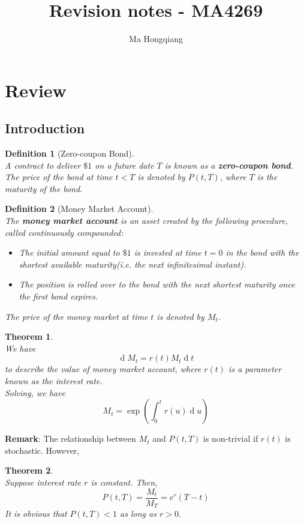 \documentclass[12pt]{article}
\newtheorem{definition}{Definition}[section]
\newtheorem{theorem}{Theorem}[section]
\theoremstyle{definition}
\DeclareMathOperator{\diff}{d}
\begin{document}
\title{Revision notes - MA4269}
\author{Ma Hongqiang}
\maketitle
\tableofcontents

\clearpage
\section{Review}
\subsection{Introduction}
\begin{definition}[Zero-coupon Bond]
\hfill\\\normalfont A contract to deliver $\$1$ on a future date $T$ is known as a \textbf{zero-coupon bond}.\\
The price of the bond at time $t<T$ is denoted by $P(t,T)$, where $T$ is the maturity of the bond.
\end{definition}
\begin{definition}[Money Market Account]
\hfill\\\normalfont The \textbf{money market account} is an asset created by the following procedure, called continuously compounded:
\begin{itemize}
  \item The initial amount equal to $\$1$ is invested at time $t=0$ in the bond with the shortest available maturity(i.e. the next infinitesimal instant).
  \item The position is rolled over to the bond with the next shortest maturity once the first bond expires.
\end{itemize}
The price of the money market at time $t$ is denoted by $M_t$.
\end{definition}
\begin{theorem}
\hfill\\\normalfont We have
\[
\diff M_t = r(t)M_t\diff t
\]
to describe the value of money market account, where $r(t)$ is a parameter known as the interest rate.\\
Solving, we have
\[
M_t = \exp\left(\int_0^t r(u)\diff u\right)
\]
\end{theorem}
\textbf{Remark}: The relationship between $M_t$ and $P(t,T)$ is non-trivial if $r(t)$ is stochastic. However, 
\begin{theorem}
\hfill\\\normalfont Suppose interest rate $r$ is constant. Then, 
\[
P(t,T)=\frac{M_t}{M_T} = e^r(T-t)
\]
It is obvious that $P(t,T)<1$ as long as $r>0$.
\end{theorem}
\end{document}
